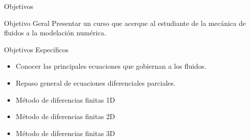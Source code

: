 \begin{frame}{Objetivos}
\begin{block}{Objetivo Geral}
Presentar un curso que acerque al estudiante de la mecánica de fluidos a la modelación numérica.
\end{block}

\begin{block}{Objetivos Específicos}
\begin{itemize}
    \item Conocer las principales ecuaciones que gobiernan a los fluidos.
    \item Repaso general de ecuaciones diferenciales parciales.
    \item Método de diferencias finitas 1D
    \item Método de diferencias finitas 2D
	\item Método de diferencias finitas 3D
\end{itemize}
\end{block}

    
\end{frame}